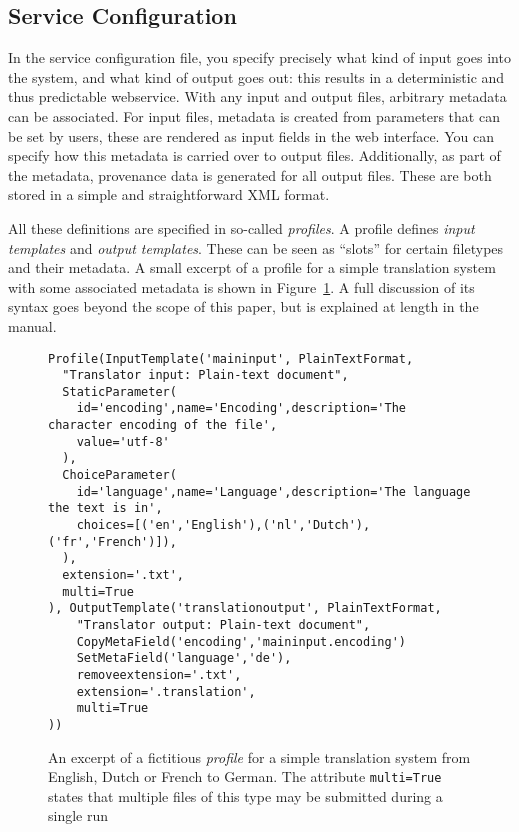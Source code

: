 \documentclass[11pt]{article}
\begin{document}
\subsection{Service Configuration}

In the service configuration file, you specify precisely what kind of input
goes into the system, and what kind of output goes out: this results in a
deterministic and thus predictable webservice.  With any input and output
files, arbitrary metadata can be associated. For input files, metadata is
created from parameters that can be set by users, these are rendered as input
fields in the web interface.  You can specify how this metadata is carried over
to output files.  Additionally, as part of the metadata, provenance data is
generated for all output files. These are both stored in a simple and
straightforward XML format.

All these definitions are specified in so-called \emph{profiles}. A profile
defines \emph{input templates} and \emph{output templates}. These can be seen
as ``slots'' for certain filetypes and their metadata. A small excerpt of a
profile for a simple translation system with some associated metadata is shown
in Figure~\ref{fig:profile}. A full discussion of its syntax goes beyond the
scope of this paper, but is explained at length in the manual.

\begin{figure}[h]
{\footnotesize{
\begin{verbatim}
Profile(InputTemplate('maininput', PlainTextFormat, 
  "Translator input: Plain-text document",  
  StaticParameter(
    id='encoding',name='Encoding',description='The character encoding of the file', 
    value='utf-8'
  ),  
  ChoiceParameter(
    id='language',name='Language',description='The language the text is in', 
    choices=[('en','English'),('nl','Dutch'),('fr','French')]),
  ),      
  extension='.txt',
  multi=True
), OutputTemplate('translationoutput', PlainTextFormat,
    "Translator output: Plain-text document",  
    CopyMetaField('encoding','maininput.encoding')
    SetMetaField('language','de'),
    removeextension='.txt',
    extension='.translation',
    multi=True
))
\end{verbatim}
}}
\caption{An excerpt of a fictitious \emph{profile} for a simple translation
system from English, Dutch or French to German. The attribute
\texttt{multi=True} states that multiple files of this type may be submitted during a single run}
\label{fig:profile}
\end{figure}
\end{document}
